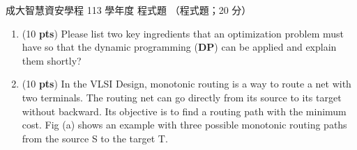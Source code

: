 \begin{pastexam}[label={px:ncku-113-isec-19}]{成大智慧資安學程 113 學年度 程式題}
（程式題；20 分）

\begin{enumerate}[label=\alph*.]
\item (10 \textbf{pts}) Please list two key ingredients that an optimization problem must have so
that the dynamic programming (\textbf{DP}) can be applied and explain them shortly?

\item (10 \textbf{pts}) In the VLSI Design, monotonic routing is a way to route a net with two
terminals. The routing net can go directly from its source to its target without backward. Its
objective is to find a routing path with the minimum cost. Fig (a) shows an example with three
possible monotonic routing paths from the source S to the target T.


\end{enumerate}
\end{pastexam}

